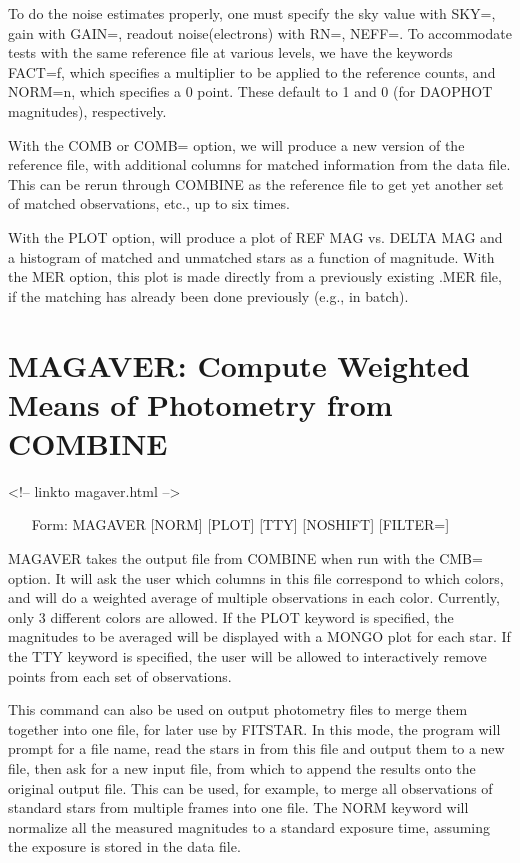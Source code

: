 To do the noise estimates properly, one must specify the sky value with
SKY=, gain with GAIN=, readout noise(electrons) with RN=, NEFF=. To
accommodate tests with the same reference file at various levels, we have
the keywords FACT=f, which specifies a multiplier to be applied to the
reference counts, and NORM=n, which specifies a 0 point. These default to 1
and 0 (for DAOPHOT magnitudes), respectively.

With the COMB or COMB= option, we will produce a new version of the
reference file, with additional columns for matched information from the
data file. This can be rerun through COMBINE as the reference file to get
yet another set of matched observations, etc., up to six times.

With the PLOT option, will produce a plot of REF MAG vs. DELTA MAG and a
histogram of matched and unmatched stars as a function of magnitude. With
the MER option, this plot is made directly from a previously existing .MER
file, if the matching has already been done previously (e.g., in batch).

\section{MAGAVER: Compute Weighted Means of Photometry from COMBINE}
\begin{rawhtml}
<!-- linkto magaver.html -->
\end{rawhtml}
\begin{itemize}
  \item[Form: MAGAVER {[NORM]} {[PLOT]} {[TTY]} {[NOSHIFT]} {[FILTER=]}\hfill]{}
\end{itemize}

MAGAVER takes the output file from COMBINE when run with the CMB=
option. It will ask the user which columns in this file correspond to which
colors, and will do a weighted average of multiple observations in each
color. Currently, only 3 different colors are allowed.  If the PLOT keyword
is specified, the magnitudes to be averaged will be displayed with a MONGO
plot for each star. If the TTY keyword is specified, the user will be
allowed to interactively remove points from each set of observations.

This command can also be used on output photometry files to merge them
together into one file, for later use by FITSTAR.  In this mode, the
program will prompt for a file name, read the stars in from this file and
output them to a new file, then ask for a new input file, from which to
append the results onto the original output file. This can be used, for
example, to merge all observations of standard stars from multiple frames
into one file.  The NORM keyword will normalize all the measured magnitudes
to a standard exposure time, assuming the exposure is stored in the data
file.

